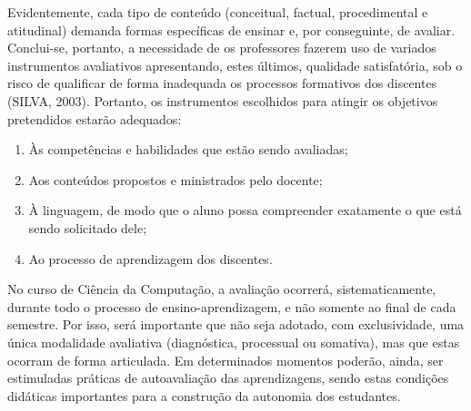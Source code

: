 \documentclass[
	12pt,				%
	openright,			%
  oneside,     %
	a4paper,			%
	chapter=TITLE,		%
	english,			%
	french,				%
	spanish,			%
	brazil				%
	]{abntex2}
\begin{document}
Evidentemente, cada tipo de conteúdo (conceitual, factual, procedimental e atitudinal) demanda formas específicas de ensinar e, por conseguinte, de avaliar. Conclui-se, portanto, a necessidade de os professores fazerem uso de variados instrumentos avaliativos apresentando, estes últimos, qualidade satisfatória, sob o risco de qualificar de forma inadequada os processos formativos dos discentes \cite{da2003avaliaccao} (SILVA, 2003). Portanto, os instrumentos escolhidos para atingir os objetivos pretendidos estarão adequados:

\begin{enumerate}[label=(\alph*)]
    \item Às competências e habilidades que estão sendo avaliadas;
    \item Aos conteúdos propostos e ministrados pelo docente; 
    \item À linguagem, de modo que o aluno possa compreender exatamente o que está sendo solicitado dele; 
    \item Ao processo de aprendizagem dos discentes.     
\end{enumerate}

No curso de Ciência da Computação, a avaliação ocorrerá, sistematicamente, durante todo o processo de ensino-aprendizagem, e não somente ao final de cada semestre. Por isso, será importante que não seja adotado, com exclusividade, uma única modalidade avaliativa (diagnóstica, processual ou somativa), mas que estas ocorram de forma articulada. Em determinados momentos poderão, ainda, ser estimuladas práticas de autoavaliação das aprendizagens, sendo estas condições didáticas importantes para a construção da autonomia dos estudantes.
\end{document}
